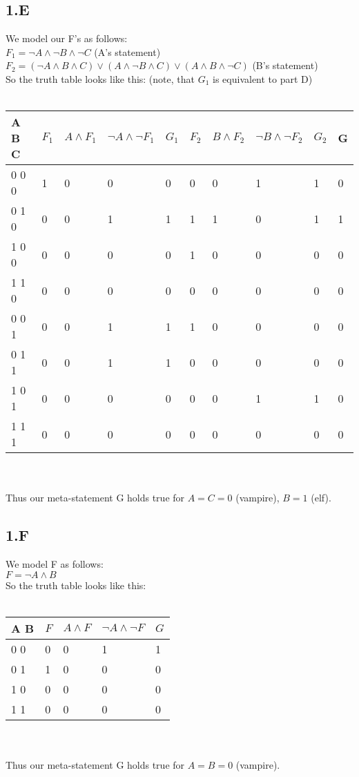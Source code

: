 \documentclass[12pt]{article}
\begin{document}
\subsection*{1.E}

We model our F's as follows:\\
$F_1 = \neg A \land \neg B \land \neg C$ (A's statement)\\	
$F_2 = (\neg A \land B \land C) \lor (A \land \neg B \land C) \lor (A \land B \land \neg C)$ (B's statement) \\%
So the truth table looks like this: (note, that $G_1$ is equivalent to part D)\\\\
\begin{tabular}{  l | l | l | l | l | l | l | l | l | l}
	A B C & $F_1$ & $A \land F_1 $ & $\neg A \land \neg F_1$ & $G_1$ & $F_2$ & $B \land F_2 $ & $\neg B \land \neg F_2$ & $G_2$ & G\\ \hline
	0 0 0 & 1 & 0 & 0 & 0 & 0 & 0 & 1 & 1 & 0 \\
	0 1 0 & 0 & 0 & 1 & 1 & 1 & 1 & 0 & 1 & 1 \\
	1 0 0 & 0 & 0 & 0 & 0 & 1 & 0 & 0 & 0 & 0 \\
	1 1 0 & 0 & 0 & 0 & 0 & 0 & 0 & 0 & 0 & 0 \\
	0 0 1 & 0 & 0 & 1 & 1 & 1 & 0 & 0 & 0 & 0 \\
	0 1 1 & 0 & 0 & 1 & 1 & 0 & 0 & 0 & 0 & 0 \\
	1 0 1 & 0 & 0 & 0 & 0 & 0 & 0 & 1 & 1 & 0 \\
	1 1 1 & 0 & 0 & 0 & 0 & 0 & 0 & 0 & 0 & 0 \\
\end{tabular} \\\\
Thus our meta-statement G holds true for $A=C=0$ (vampire), $B=1$ (elf).

\subsection*{1.F}

We model F as follows:\\
$F = \neg A \land B$ \\
So the truth table looks like this:\\\\
\begin{tabular}{  l | l | l | l | l}
	A B & $F$ & $A \land F $ & $\neg A \land \neg F$ & $G$ \\ \hline
	0 0 & 0 & 0 & 1 & 1 \\
	0 1 & 1 & 0 & 0 & 0 \\
	1 0 & 0 & 0 & 0 & 0 \\
	1 1 & 0 & 0 & 0 & 0 \\
\end{tabular} \\\\
Thus our meta-statement G holds true for $A=B=0$ (vampire).
\end{document}
